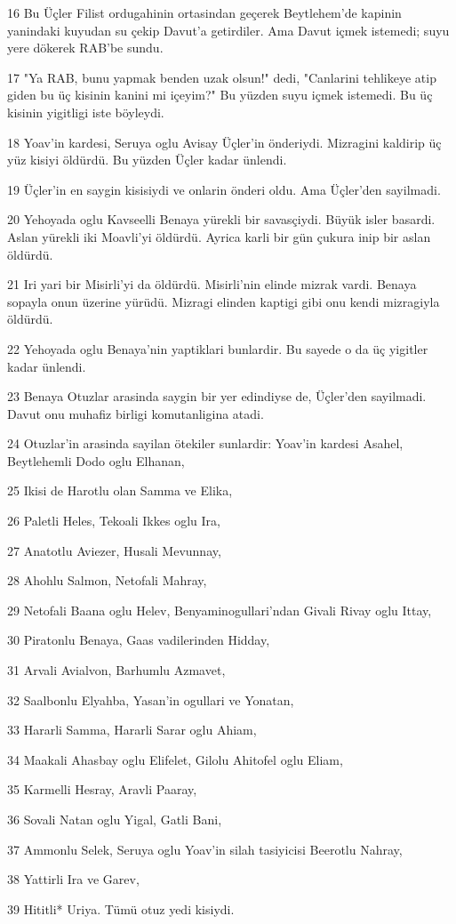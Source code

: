 \par 16 Bu Üçler Filist ordugahinin ortasindan geçerek Beytlehem'de kapinin yanindaki kuyudan su çekip Davut'a getirdiler. Ama Davut içmek istemedi; suyu yere dökerek RAB'be sundu.
\par 17 "Ya RAB, bunu yapmak benden uzak olsun!" dedi, "Canlarini tehlikeye atip giden bu üç kisinin kanini mi içeyim?" Bu yüzden suyu içmek istemedi. Bu üç kisinin yigitligi iste böyleydi.
\par 18 Yoav'in kardesi, Seruya oglu Avisay Üçler'in önderiydi. Mizragini kaldirip üç yüz kisiyi öldürdü. Bu yüzden Üçler kadar ünlendi.
\par 19 Üçler'in en saygin kisisiydi ve onlarin önderi oldu. Ama Üçler'den sayilmadi.
\par 20 Yehoyada oglu Kavseelli Benaya yürekli bir savasçiydi. Büyük isler basardi. Aslan yürekli iki Moavli'yi öldürdü. Ayrica karli bir gün çukura inip bir aslan öldürdü.
\par 21 Iri yari bir Misirli'yi da öldürdü. Misirli'nin elinde mizrak vardi. Benaya sopayla onun üzerine yürüdü. Mizragi elinden kaptigi gibi onu kendi mizragiyla öldürdü.
\par 22 Yehoyada oglu Benaya'nin yaptiklari bunlardir. Bu sayede o da üç yigitler kadar ünlendi.
\par 23 Benaya Otuzlar arasinda saygin bir yer edindiyse de, Üçler'den sayilmadi. Davut onu muhafiz birligi komutanligina atadi.
\par 24 Otuzlar'in arasinda sayilan ötekiler sunlardir: Yoav'in kardesi Asahel, Beytlehemli Dodo oglu Elhanan,
\par 25 Ikisi de Harotlu olan Samma ve Elika,
\par 26 Paletli Heles, Tekoali Ikkes oglu Ira,
\par 27 Anatotlu Aviezer, Husali Mevunnay,
\par 28 Ahohlu Salmon, Netofali Mahray,
\par 29 Netofali Baana oglu Helev, Benyaminogullari'ndan Givali Rivay oglu Ittay,
\par 30 Piratonlu Benaya, Gaas vadilerinden Hidday,
\par 31 Arvali Avialvon, Barhumlu Azmavet,
\par 32 Saalbonlu Elyahba, Yasan'in ogullari ve Yonatan,
\par 33 Hararli Samma, Hararli Sarar oglu Ahiam,
\par 34 Maakali Ahasbay oglu Elifelet, Gilolu Ahitofel oglu Eliam,
\par 35 Karmelli Hesray, Aravli Paaray,
\par 36 Sovali Natan oglu Yigal, Gatli Bani,
\par 37 Ammonlu Selek, Seruya oglu Yoav'in silah tasiyicisi Beerotlu Nahray,
\par 38 Yattirli Ira ve Garev,
\par 39 Hititli* Uriya. Tümü otuz yedi kisiydi.

